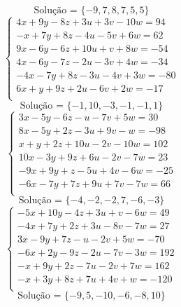 \documentclass[12pt,oneside,a4paper]{article}
\begin{document}
\begin{equation*}
\text{Solução = }\{-9,7,8,7,5,5\}
\end{equation*}
\vspace{\baselineskip}
\begin{equation*}
\begin{cases}
4x+9y-8z+3u+3v-10w=94 \\
-x+7y+8z-4u-5v+6w=62 \\
9x-6y-6z+10u+v+8w=-54 \\
4x-6y-7z-2u-3v+4w=-34 \\
-4x-7y+8z-3u-4v+3w=-80 \\
6x+y+9z+2u-6v+2w=-17 \\
\end{cases}
\end{equation*}
\begin{equation*}
\text{Solução = }\{-1,10,-3,-1,-1,1\}
\end{equation*}
\vspace{\baselineskip}
\begin{equation*}
\begin{cases}
3x-5y-6z-u-7v+5w=30 \\
8x-5y+2z-3u+9v-w=-98 \\
x+y+2z+10u-2v-10w=102 \\
10x-3y+9z+6u-2v-7w=23 \\
-9x+9y+z-5u+4v-6w=-25 \\
-6x-7y+7z+9u+7v-7w=66 \\
\end{cases}
\end{equation*}
\begin{equation*}
\text{Solução = }\{-4,-2,-2,7,-6,-3\}
\end{equation*}
\vspace{\baselineskip}
\begin{equation*}
\begin{cases}
-5x+10y-4z+3u+v-6w=49 \\
-4x+7y+2z+3u-8v-7w=27 \\
3x-9y+7z-u-2v+5w=-70 \\
-6x+2y-9z-2u-7v-3w=192 \\
-x+9y+2z-7u-2v+7w=162 \\
-x+3y+8z+7u+4v+w=-120 \\
\end{cases}
\end{equation*}
\begin{equation*}
\text{Solução = }\{-9,5,-10,-6,-8,10\}
\end{equation*}
\end{document}
